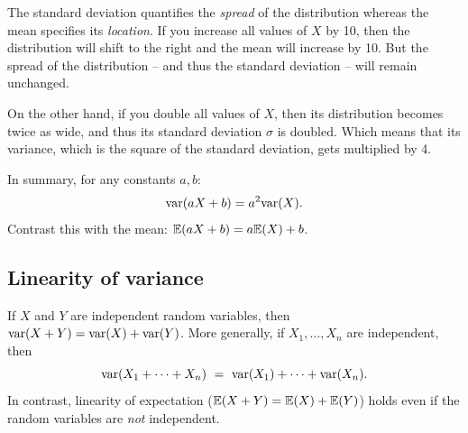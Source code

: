 \noindent
The standard deviation quantifies the {\it spread} of the distribution
whereas the mean specifies its {\it location}. If you increase all values of
$X$ by 10, then the distribution will shift to the right and the mean will 
increase by 10. But the spread of the distribution -- and thus the standard
deviation -- will remain unchanged.

On the other hand, if you double all values of $X$, then its distribution 
becomes twice as wide, and thus its standard deviation $\sigma$ is doubled. 
Which means that its variance, which is the square of the standard deviation,
gets multiplied by 4.

In summary, for any constants $a,b$:
$$ \mbox{\rm var}(aX+b) = a^2 \mbox{\rm var}(X) .$$
Contrast this with the mean: $\mathbb{E}(aX + b) = a \mathbb{E}(X) + b$.

\subsection{Linearity of variance}

If $X$ and $Y$ are independent random variables, then $\mbox{\rm var}(X+Y) = \mbox{\rm var}(X) + \mbox{\rm var}(Y)$.
More generally, if $X_1, \ldots, X_n$ are independent, then
$$ \var(X_1 + \cdots + X_n)
\ = \ 
\var(X_1) + \cdots + \var(X_n).
$$
In contrast, linearity of expectation ($\mathbb{E}(X+Y) = \mathbb{E}(X) + \mathbb{E}(Y)$) holds
even if the random variables are {\it not} independent.


